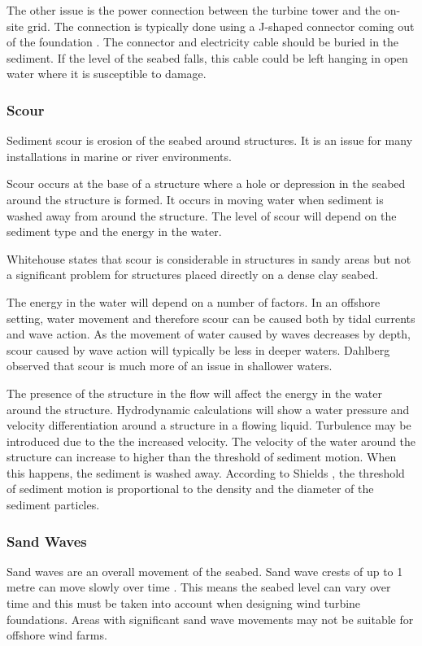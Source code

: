\documentclass[12pt]{article} %
\begin{document}
The other issue is the power connection between the turbine tower and the on-site grid. The connection is typically done using a J-shaped connector coming out of the foundation \cite{OffshoreWind:1}. The connector and electricity cable should be buried in the sediment. If the level of the seabed falls, this cable could be left hanging in open water where it is susceptible to damage.

\subsubsection{Scour}
Sediment scour is erosion of the seabed around structures. It is an issue for many installations in marine or river environments. 

Scour occurs at the base of a structure where a hole or depression in the seabed around the structure is formed. It occurs in moving water when sediment is washed away from around the structure.
The level of scour will depend on the sediment type and the energy in the water.

Whitehouse \cite{whitehouse} states that scour is considerable in structures in sandy areas but not a significant problem for structures placed directly on a dense clay seabed.

The energy in the water will depend on a number of factors. In an offshore setting, water movement and therefore scour can be caused both by tidal currents and wave action.
As the movement of water caused by waves decreases by depth, scour caused by wave action will typically be less in deeper waters. 
Dahlberg \cite{dahlberg} observed that scour is much more of an issue in shallower waters.

The presence of the structure in the flow will affect the energy in the water around the structure. Hydrodynamic calculations will show a water pressure and velocity differentiation around a structure in a flowing liquid. Turbulence may be introduced due to the the increased velocity.
The velocity of the water around the structure can increase to higher than the threshold of sediment motion. When this happens, the sediment is washed away.
According to Shields \cite{shields_application_1936}, the threshold of sediment motion is proportional to the density and the diameter of the sediment particles.


\subsubsection{Sand Waves}
Sand waves are an overall movement of the seabed. Sand wave crests of up to 1 metre can move slowly over time \cite{byrneocleirigh}. This means the seabed level can vary over time and this must be taken into account when designing wind turbine foundations.
Areas with significant sand wave movements may not be suitable for offshore wind farms.
\end{document}
